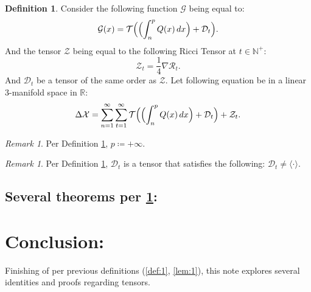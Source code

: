 \documentclass[10pt]{article}
\theoremstyle{plain}
\theoremstyle{definition}
\newtheorem{definition}[theorem]{Definition}
\theoremstyle{remark}
\newtheorem{remark}[theorem]{Remark}
\begin{document}
\begin{definition}
\label{def:eq-tensor}
Consider the following function $\mathcal{G}$ being equal to:
\begin{equation}
	\mathcal{G}(x) = {\mathcal{T}}\Bigl(\Bigl( \int_{n}^{p} Q(x) \, dx \Bigr) + \mathcal{D}_t\Bigr).
\end{equation}
And the tensor $\mathcal{Z}$ being equal to the following Ricci Tensor at $t \in \mathbb{N}^{+}$:
\begin{equation}
	\mathcal{Z}_t = \frac{1}{4} \nabla \mathcal{R}_{t}.
\end{equation}
And $\mathcal{D}_t$ be a tensor of the same order as $\mathcal{Z}$. Let following equation be in a linear 3-manifold space in $\mathbb{R}$:
\begin{equation}
	\Delta \mathcal{X} = \sum_{n=1}^{\infty} \sum_{t=1}^{\infty} {\mathcal{T}}\Bigl(\Bigl( \int_{n}^{p} Q(x) \, dx \Bigr) + \mathcal{D}_t\Bigr) + \mathcal{Z}_t.
\end{equation}
\end{definition}

\begin{remark}
	\label{rem:eq-tensor-p}
	Per Definition \ref{def:eq-tensor}, $p \coloneq + \infty$.
\end{remark}

\begin{remark}
	\label{rem:eq-tensor}
	Per Definition \ref{def:eq-tensor}, $\mathcal{D}_t$ is a tensor that satisfies the following: $\mathcal{D}_t \neq \langle \cdot \rangle$.
\end{remark}

\subsection{Several theorems per \ref{def:eq-tensor}:}

\section{Conclusion:}
Finishing of per previous definitions (\ref{def:1}, \ref{lem:1}), this note explores several identities and proofs regarding tensors.

\nocite{*}



\end{document}
